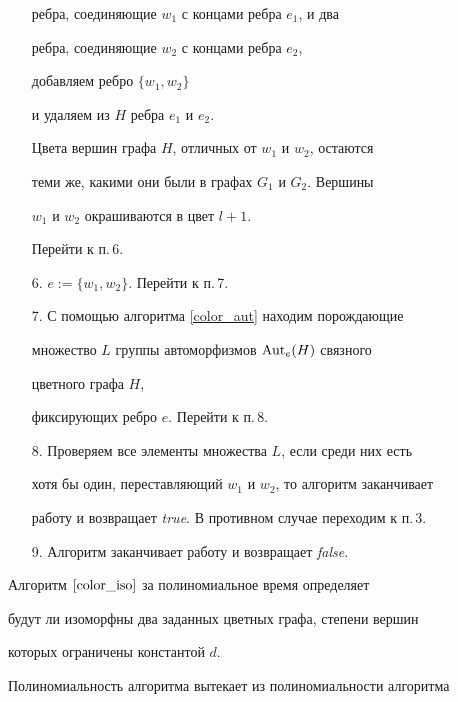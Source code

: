 \begin{algs}
\begin{itemize}
ребра, соединяющие $w_1$ с концами ребра $e_1$, и два


ребра, соединяющие $w_2$ с концами ребра $e_2$,


добавляем ребро $\{w_1, w_2\}$


и удаляем из $H$ ребра $e_1$ и $e_2$.


Цвета вершин графа $H$, отличных от $w_1$ и $w_2$, остаются


теми же, какими они были в графах $G_1$ и $G_2$. Вершины


$w_1$ и $w_2$ окрашиваются в цвет $l+1$.


Перейти к п.\,6.


\item[6.] $e:=\{w_1, w_2\}$. Перейти к п.\,7.


\item[7.] С помощью алгоритма \ref{color_aut} находим порождающие


множество $L$ группы автоморфизмов $\operatorname{Aut}_e(H)$ связного


цветного графа $H$,


фиксирующих ребро $e$. Перейти к п.\,8.


\item[8.] Проверяем все элементы множества $L$, если среди них есть


хотя бы один, переставляющий $w_1$ и $w_2$, то алгоритм заканчивает


работу и возвращает {\it true}. В противном случае переходим к п.\,3.


\item[9.] Алгоритм заканчивает работу и возвращает {\it false}.


\end{itemize}


\end{algs}





\begin{thms}


Алгоритм $\ref{color_iso}$ за полиномиальное время определяет


будут ли изоморфны два заданных цветных графа, степени вершин


которых ограничены константой $d$.


\end{thms}





Полиномиальность алгоритма вытекает из полиномиальности алгоритма


